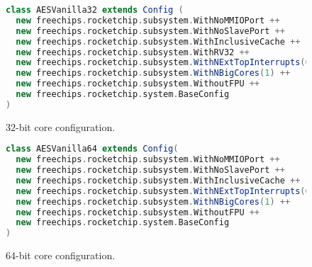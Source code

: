 
\vspace*{\fill}

\begin{figure}[!h]
\begin{lstlisting}[style={block},language={scala}]
class AESVanilla32 extends Config (
  new freechips.rocketchip.subsystem.WithNoMMIOPort ++
  new freechips.rocketchip.subsystem.WithNoSlavePort ++
  new freechips.rocketchip.subsystem.WithInclusiveCache ++
  new freechips.rocketchip.subsystem.WithRV32 ++
  new freechips.rocketchip.subsystem.WithNExtTopInterrupts(0) ++
  new freechips.rocketchip.subsystem.WithNBigCores(1) ++
  new freechips.rocketchip.subsystem.WithoutFPU ++
  new freechips.rocketchip.system.BaseConfig
)
\end{lstlisting}
\caption{$32$-bit  core configuration.}
\label{fig:rocket:32}
\end{figure}

\begin{figure}[!h]
\begin{lstlisting}[style={block},language={scala}]
class AESVanilla64 extends Config(
  new freechips.rocketchip.subsystem.WithNoMMIOPort ++
  new freechips.rocketchip.subsystem.WithNoSlavePort ++
  new freechips.rocketchip.subsystem.WithInclusiveCache ++
  new freechips.rocketchip.subsystem.WithNExtTopInterrupts(0) ++
  new freechips.rocketchip.subsystem.WithNBigCores(1) ++
  new freechips.rocketchip.subsystem.WithoutFPU ++
  new freechips.rocketchip.system.BaseConfig
)
\end{lstlisting}
\caption{$64$-bit  core configuration.}
\label{fig:rocket:64}
\end{figure}

\vspace*{\fill}

